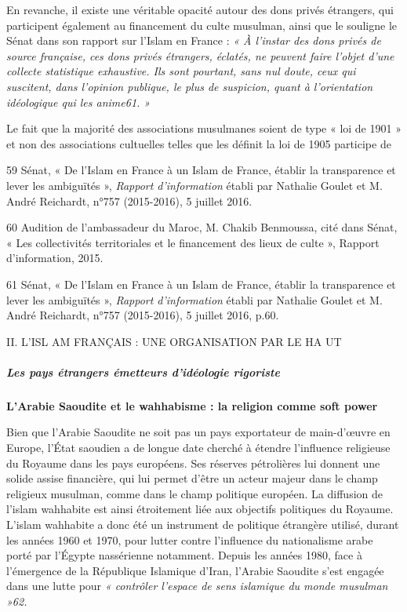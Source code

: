 En revanche, il existe une véritable opacité autour des dons privés
étrangers, qui participent également au financement du culte musulman,
ainsi que le souligne le Sénat dans son rapport sur l'Islam en France :
\emph{« À l'instar des dons privés de source française, ces dons privés
étrangers, éclatés, ne peuvent faire l'objet d'une collecte statistique
exhaustive. Ils sont pourtant, sans nul doute, ceux qui suscitent, dans
l'opinion publique, le plus de suspicion, quant à l'orientation
idéologique qui les anime61. »}

Le fait que la majorité des associations musulmanes soient de type « loi
de 1901 » et non des associations cultuelles telles que les définit la
loi de 1905 participe de

59 Sénat, « De l'Islam en France à un Islam de France, établir la
transparence et lever les ambiguïtés », \emph{Rapport d'information}
établi par Nathalie Goulet et M. André Reichardt, n°757 (2015-2016), 5
juillet 2016.

60 Audition de l'ambassadeur du Maroc, M. Chakib Benmoussa, cité dans
Sénat, « Les collectivités territoriales et le financement des lieux de
culte », Rapport d'information, 2015.

61 Sénat, « De l'Islam en France à un Islam de France, établir la
transparence et lever les ambiguïtés », \emph{Rapport d'information}
établi par Nathalie Goulet et M. André Reichardt, n°757 (2015-2016), 5
juillet 2016, p.60.

II. L'ISL AM FRANÇAIS : UNE ORGANISATION PAR LE HA UT


\hypertarget{les-pays-uxe9trangers-uxe9metteurs-diduxe9ologie-rigoriste}{%
\subparagraph{Les pays étrangers émetteurs d'idéologie
rigoriste}\label{les-pays-uxe9trangers-uxe9metteurs-diduxe9ologie-rigoriste}}


\textbf{L'Arabie Saoudite et le wahhabisme : la religion comme soft
power}

Bien que l'Arabie Saoudite ne soit pas un pays exportateur de
main-d'œuvre en Europe, l'État saoudien a de longue date cherché à
étendre l'influence religieuse du Royaume dans les pays européens. Ses
réserves pétrolières lui donnent une solide assise financière, qui lui
permet d'être un acteur majeur dans le champ religieux musulman, comme
dans le champ politique européen. La diffusion de l'islam wahhabite est
ainsi étroitement liée aux objectifs politiques du Royaume. L'islam
wahhabite a donc été un instrument de politique étrangère utilisé,
durant les années 1960 et 1970, pour lutter contre l'influence du
nationalisme arabe porté par l'Égypte nassérienne notamment. Depuis les
années 1980, face à l'émergence de la République Islamique d'Iran,
l'Arabie Saoudite s'est engagée dans une lutte pour \emph{« contrôler
l'espace de sens islamique du monde musulman »62.}


